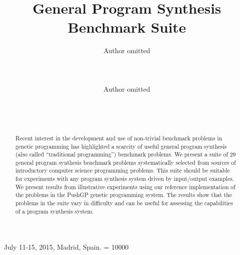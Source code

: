 \documentclass{sig-alternate}
\begin{document}
%
 {July 11-15, 2015, Madrid, Spain.}
\widowpenalty = 10000

\title{General Program Synthesis Benchmark Suite}


\author{
\alignauthor
Author omitted\\
       \\
       \\
       \\
\alignauthor
Author omitted\\
       \\
       \\
       \\
}

\maketitle

\begin{abstract}
Recent interest in the development and use of non-trivial benchmark problems in genetic programming has highlighted a scarcity of useful general program synthesis (also called ``traditional programming'') benchmark problems. 
We present a suite of $29$ general program synthesis benchmark problems systematically selected from sources of introductory computer science programming problems. 
This suite should be suitable for experiments with any program synthesis system driven by input/output examples. 
We present results from illustrative experiments using our reference implementation of the problems in the PushGP genetic programming system. The results show that the problems in the suite vary in difficulty and can be useful for assessing the capabilities of a program synthesis system.
\end{abstract}
\end{document}
